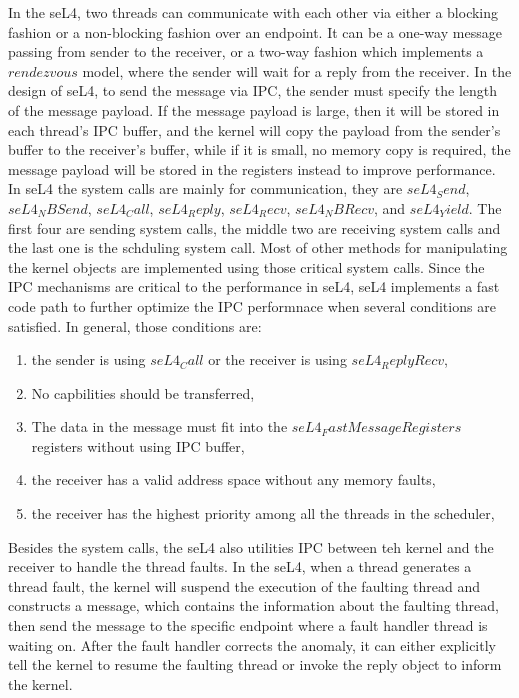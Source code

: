 In the seL4, two threads can communicate with each other via either a blocking fashion or a non-blocking fashion over an endpoint. It can be a one-way message passing from sender to the receiver, or a two-way fashion which implements a $rendezvous$ model, where the sender will wait for a reply from the receiver. In the design of seL4, to send the message via IPC, the sender must specify the length of the message payload. If the message payload is large, then it will be stored in each thread's IPC buffer, and the kernel will copy the payload from the sender's buffer to the receiver's buffer, while if it is small, no memory copy is required, the message payload will be stored in the registers instead to improve performance. In seL4 the system calls are mainly for communication, they are $seL4_Send$, $seL4_NBSend$, $seL4_Call$, $seL4_Reply$, $seL4_Recv$, $seL4_NBRecv$, and $seL4_Yield$. The first four are sending system calls, the middle two are receiving system calls and the last one is the schduling system call. Most of other methods for manipulating the kernel objects are implemented using those critical system calls. Since the IPC mechanisms are critical to the performance in seL4, seL4 implements a fast code path to further optimize the IPC performnace when several conditions are satisfied. In general, those conditions are: 

\begin{enumerate}
    \item the sender is using $seL4_Call$ or the receiver is using $seL4_ReplyRecv$,
    \item No capbilities should be transferred,
    \item The data in the message must fit into the $seL4_FastMessageRegisters$ registers without using IPC buffer,
    \item the receiver has a valid address space without any memory faults,
    \item the receiver has the highest priority among all the threads in the scheduler,
\end{enumerate}

Besides the system calls, the seL4 also utilities IPC between teh kernel and the receiver to handle the thread faults. In the seL4, when a thread generates a thread fault, the kernel will suspend the execution of the faulting thread and constructs a message, which contains the information about the faulting thread, then send the message to the specific endpoint where a fault handler thread is waiting on. After the fault handler corrects the anomaly, it can either explicitly tell the kernel to resume the faulting thread or invoke the reply object to inform the kernel. 

